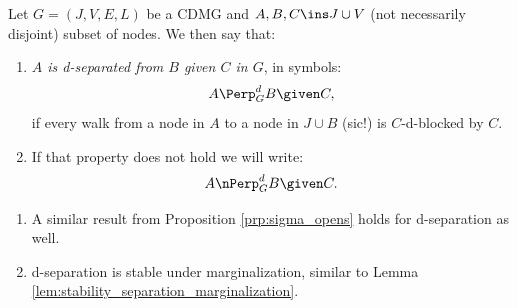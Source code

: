 \begin{Def}[d-separation]
    Let $G=(J,V,E,L)$ be a CDMG and $A,B,C \ins J \cup V$ (not necessarily disjoint) subset of nodes.
    We then say that:
    \begin{enumerate}
        \item \emph{$A$ is d-separated from $B$ given $C$ in $G$}, in symbols:
    \[ A \Perp^d_G B \given C,  \]
    if every walk from a node in $A$ to a node in $J \cup B$ (sic!) is $C$-d-blocked by $C$.
        \item If that property does not hold we will write:
            \[ A \nPerp^d_G B \given C.\]
    \end{enumerate}
\end{Def}

\begin{Rem}
    \begin{enumerate}
        \item A similar result from Proposition \ref{prp:sigma_opens} holds for d-separation as well.
        \item d-separation is stable under marginalization, similar to Lemma \ref{lem:stability_separation_marginalization}.
    \end{enumerate}
\end{Rem}


